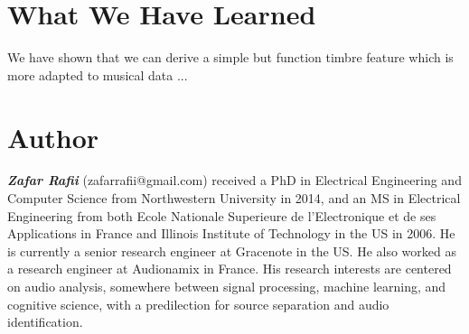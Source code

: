\documentclass[journal]{IEEEtran}
\begin{document}



\section{What We Have Learned}

We have shown that we can derive a simple but function timbre feature which is more adapted to musical data ...




\section{Author}

\textit{\textbf{Zafar Rafii}} (zafarrafii@gmail.com) received a PhD in Electrical Engineering and Computer Science from Northwestern University in 2014, and an MS in Electrical Engineering from both Ecole Nationale Superieure de l’Electronique et de ses Applications in France and Illinois Institute of Technology in the US in 2006. He is currently a senior research engineer at Gracenote in the US. He also worked as a research engineer at Audionamix in France. His research interests are centered on audio analysis, somewhere between signal processing, machine learning, and cognitive science, with a predilection for source separation and audio identification.



\end{document}
